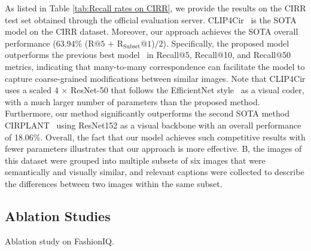 \documentclass[letterpaper]{article} \usepackage{aaai24}  \usepackage{times}  \usepackage{helvet}  \usepackage{courier}  \usepackage[hyphens]{url}  \usepackage{graphicx} \urlstyle{rm} \def\UrlFont{\rm}  \usepackage{natbib}  \usepackage{caption} \frenchspacing  \setlength{\pdfpagewidth}{8.5in} \setlength{\pdfpageheight}{11in} \usepackage{amsmath,amsfonts}
\begin{document}
As listed in Table \ref{tab:Recall rates on CIRR}, we provide the results on the CIRR test set obtained through the official evaluation server. CLIP4Cir~\cite{Baldrati2022combiner} is the SOTA model on the CIRR dataset.
Moreover, our approach achieves the SOTA overall performance (63.94\% (R$@5$ $+$ R$_{\text{Subset}}@1$)$/2$). Specifically, the proposed model outperforms the previous best model~\cite{Baldrati2022combiner} in Recall@5, Recall@10, and Recall@50 metrics, indicating that many-to-many correspondence can facilitate the model to capture coarse-grained modifications between similar images. Note that CLIP4Cir uses a scaled 4 $\times$ ResNet-50 that follows the EfficientNet style~\cite{Tan2019icml} as a visual coder, with a much larger number of parameters than the proposed method. Furthermore, our method significantly outperforms the second SOTA method CIRPLANT~\cite{liu2021image} using ResNet152 as a visual backbone with an overall performance of 18.06\%. Overall, the fact that our model achieves such competitive results with fewer parameters illustrates that our approach is more effective. B, the images of this dataset were grouped into multiple subsets of six images that were semantically and visually similar, and relevant captions were collected to describe the differences between two images within the same subset.

\subsection{Ablation Studies}

\begin{threeparttable}
    \centering
    \caption{Ablation study on FashionIQ. }
    \label{tab:Ablation}
\end{threeparttable}
\end{document}
